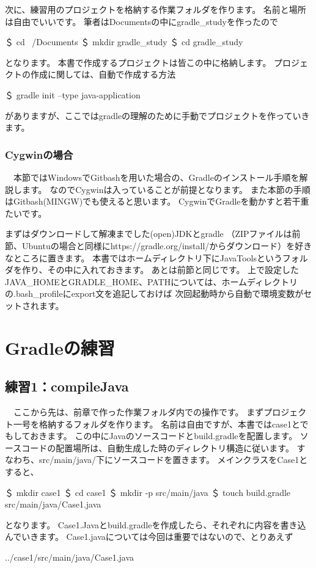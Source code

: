 \documentclass[a4paper,12pt]{article}
\begin{document}
次に、練習用のプロジェクトを格納する作業フォルダを作ります。
名前と場所は自由でいいです。
筆者はDocumentsの中にgradle\_studyを作ったので

\begin{shell}[作業フォルダの作成]
＄ cd ~/Documents
＄ mkdir gradle_study
＄ cd gradle_study
\end{shell}
となります。
本書で作成するプロジェクトは皆この中に格納します。
プロジェクトの作成に関しては、自動で作成する方法
\begin{shell}[楽な方法]
＄ gradle init --type java-application
\end{shell}
がありますが、ここではgradleの理解のために手動でプロジェクトを作っていきます。

\subsubsection{Cygwinの場合}

　本節ではWindowsでGitbashを用いた場合の、Gradleのインストール手順を解説します。
なのでCygwinは入っていることが前提となります。
また本節の手順はGitbash(MINGW)でも使えると思います。
CygwinでGradleを動かすと若干重たいです。

まずはダウンロードして解凍までした(open)JDKとgradle
（ZIPファイルは前節、Ubuntuの場合と同様にhttps://gradle.org/install/からダウンロード）を好きなところに置きます。
本書ではホームディレクトリ下にJavaToolsというフォルダを作り、その中に入れておきます。
あとは前節と同じです。
上で設定したJAVA\_HOMEとGRADLE\_HOME、PATHについては、ホームディレクトリの.bash\_profileにexport文を追記しておけば
次回起動時から自動で環境変数がセットされます。


\section{Gradleの練習}

\subsection{練習1：compileJava}

　ここから先は、前章で作った作業フォルダ内での操作です。
まずプロジェクト一号を格納するフォルダを作ります。
名前は自由ですが、本書ではcase1とでもしておきます。
この中にJavaのソースコードとbuild.gradleを配置します。
ソースコードの配置場所は、自動生成した時のディレクトリ構造に従います。
すなわち、src/main/java/下にソースコードを置きます。
メインクラスをCase1とすると、
\begin{shell}[プロジェクトの作成]
＄ mkdir case1
＄ cd case1
＄ mkdir -p src/main/java
＄ touch build.gradle src/main/java/Case1.java
\end{shell}
となります。
Case1.Javaとbuild.gradleを作成したら、それぞれに内容を書き込んでいきます。
Case1.javaについては今回は重要ではないので、とりあえず
\begin{lstinputlisting}[language=Java,caption=Case1.java]
	{../case1/src/main/java/Case1.java}
\end{lstinputlisting}
\end{document}
